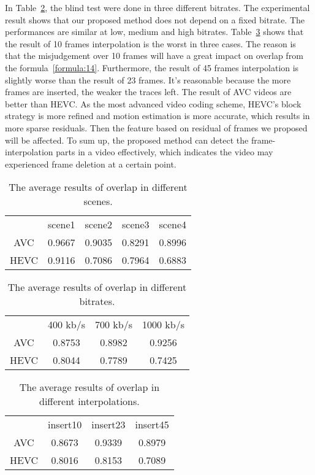 \documentclass[pdftex,twocolumn,epjc3]{svjour3}          %
\begin{document}
In Table~\ref{table:9}, the blind test were done in three different bitrates. The experimental result shows that our proposed method does not depend on a fixed bitrate. The performances are similar at low, medium and high bitrates. Table~\ref{table:10} shows that the result of 10 frames interpolation is the worst in three cases. The reason is that the misjudgement over 10 frames will have a great impact on overlap from the formula~\ref{formula:14}. Furthermore, the result of 45 frames interpolation is slightly worse than the result of 23 frames. It's reasonable because the more frames are inserted, the weaker the traces left. The result of AVC videos are better than HEVC. As the most advanced video coding scheme, HEVC's block strategy is more refined and motion estimation is more accurate, which results in more sparse residuals. Then the feature based on residual of frames we proposed will be affected. To sum up, the proposed method can detect the frame-interpolation parts in a video effectively, which indicates the video may experienced frame deletion at a certain point.
\begin{table}[h]
\renewcommand\arraystretch{1.5}
    \caption{The average results of overlap in different scenes.}\label{table:8}
        \begin{tabular*}{7cm}{ccccc}
            \hline
            \ & scene1 &scene2 & scene3 &scene4 \\
            \noalign{\smallskip}\hline\noalign{\smallskip}
            AVC & 0.9667 & 0.9035 & 0.8291 & 0.8996  \\
            HEVC & 0.9116 & 0.7086 & 0.7964 & 0.6883
            \\ \hline
        \end{tabular*}
\end{table}
\begin{table}[h]
\renewcommand\arraystretch{1.5}
    \caption{The average results of overlap in different bitrates.}\label{table:9}
        \begin{tabular*}{6cm}{cccc}
            \hline
            \ & 400 kb/s & 700 kb/s & 1000 kb/s \\
            \noalign{\smallskip}\hline\noalign{\smallskip}
            AVC & 0.8753 & 0.8982 & 0.9256 \\
            HEVC & 0.8044 & 0.7789 & 0.7425
            \\ \hline
        \end{tabular*}
\end{table}
\begin{table}[h]
\renewcommand\arraystretch{1.5}
    \caption{The average results of overlap in different interpolations.}\label{table:10}
        \begin{tabular*}{6cm}{cccc}
            \hline
            \ & insert10 & insert23 & insert45 \\
            \noalign{\smallskip}\hline\noalign{\smallskip}
            AVC & 0.8673 & 0.9339 & 0.8979 \\
            HEVC & 0.8016 & 0.8153 & 0.7089
            \\ \hline
        \end{tabular*}
\end{table}
\end{document}
